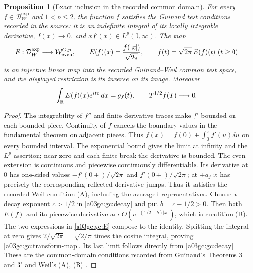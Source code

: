 \documentclass[11pt,a4paper]{article}
\newtheorem{proposition}[theorem]{Proposition}
\begin{document}
\begin{proposition}[Exact inclusion in the recorded common domain]
For every $f\in\mathcal D_W^{\exp}$ and $1<p\le2$, the function $f$
satisfies the Guinand test conditions recorded in the source:
it is an indefinite integral of its locally integrable derivative,
$f(x)\to0$, and $xf'(x)\in L^p(0,\infty)$.
The map
\begin{equation}
 E:\mathcal D_W^{\exp}\longrightarrow
       \mathcal W_{\rm even}^{G,p},\qquad
 E(f)(x)=\frac{f(|x|)}{\sqrt{2\pi}},
 \qquad f(t)=\sqrt{2\pi}\,E(f)(t)\ (t\ge0)
 \label{a03gc:gc:E}
\end{equation}
is an injective linear map into the recorded Guinand--Weil common test
space, and the displayed restriction is its inverse on its image.
Moreover
\begin{equation}
 \int_\mathbb R E(f)(x)e^{itx}\,dx=g_f(t),\qquad
 T^{1/2}f(T)\longrightarrow0.
 \label{a03gc:gc:transform-map}
\end{equation}
\end{proposition}
\begin{proof}
The integrability of $f''$ and finite derivative traces make $f'$ bounded
on each bounded piece.  Continuity of $f$ cancels the boundary values in
the fundamental theorem on adjacent pieces.  Thus
$f(x)=f(0)+\int_0^x f'(u)du$ on every bounded interval.
The exponential bound gives the limit at infinity and the $L^p$ assertion;
near zero and each finite break the derivative is bounded.
The even extension is continuous and piecewise continuously
differentiable.  Its derivative at $0$ has one-sided values
$-f'(0+)/\sqrt{2\pi}$ and $f'(0+)/\sqrt{2\pi}$; at $\pm a_j$ it
has precisely the corresponding reflected derivative jumps.  Thus it
satisfies the recorded Weil condition (A), including the averaged
representatives.  Choose a decay exponent $c>1/2$ in \eqref{a03gc:gc:decay} and
put $b=c-1/2>0$.  Then both $E(f)$ and its piecewise derivative are
$O(e^{-(1/2+b)|x|})$, which is condition (B).
The two expressions in \eqref{a03gc:gc:E} compose to the identity.  Splitting
the integral at zero gives
$2/\sqrt{2\pi}=\sqrt{2/\pi}$ times the cosine integral, proving
\eqref{a03gc:gc:transform-map}.  Its last limit follows directly from
\eqref{a03gc:gc:decay}.  These are the common-domain conditions recorded from
Guinand's Theorems 3 and $3'$ and Weil's (A), (B)
\cite[pp.~112--115]{a03gc:guinand1948}\cite[Collected Papers II, pp.~52--58]{a03gc:weil1952}.
\end{proof}
\end{document}
